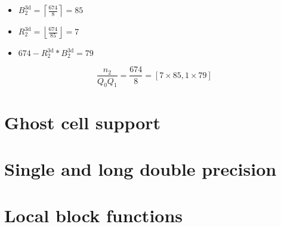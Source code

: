 \begin{itemize}
 \item $B_2^\textrm{3d} = \left\lceil \frac{674}{8} \right\rceil = 85$
 \item $R_2^\textrm{3d} = \left\lfloor \frac{674}{85} \right\rfloor = 7$
 \item $674 - R_2^\textrm{3d}*B_2^\textrm{3d} = 79$
\end{itemize}
\begin{equation*}
  \frac{n_2}{Q_0Q_1} = \frac{674}{8} = \left[7\times 85, 1\times 79 \right]
\end{equation*}

\section{Ghost cell support}


\section{Single and long double precision}


\section{Local block functions}


